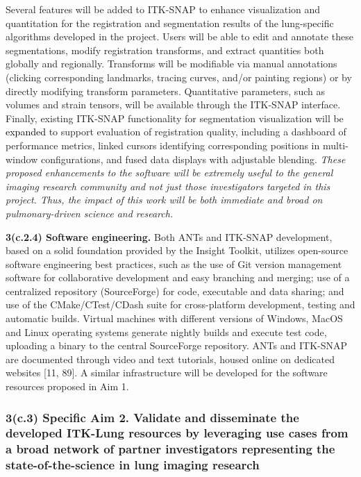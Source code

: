 \documentclass[11pt,]{article}
\begin{document}
Several features will be added to ITK-SNAP to enhance visualization and
quantitation for the registration and segmentation results of the
lung-specific algorithms developed in the project. Users will be able to
edit and annotate these segmentations, modify registration transforms,
and extract quantities both globally and regionally. Transforms will be
modifiable via manual annotations (clicking corresponding landmarks,
tracing curves, and/or painting regions) or by directly modifying
transform parameters. Quantitative parameters, such as volumes and
strain tensors, will be available through the ITK-SNAP interface.
Finally, existing ITK-SNAP functionality for segmentation visualization
will be \textcolor{black}{expanded} to support evaluation of
registration quality, including a dashboard of performance metrics,
linked cursors identifying corresponding positions in multi-window
configurations, and fused data displays with adjustable blending.
\emph{These proposed enhancements to the software will be extremely
useful to the general imaging research community and not just those
investigators targeted in this project. Thus, the impact of this work
will be both immediate and broad on pulmonary-driven science and
research.}

\textbf{3(c.2.4) Software engineering.} Both ANTs and ITK-SNAP
development, based on a solid foundation provided by the Insight
Toolkit, utilizes open-source software engineering best practices, such
as the use of Git version management software for collaborative
development and easy branching and merging; use of a centralized
repository (SourceForge) for code, executable and data sharing; and use
of the CMake/CTest/CDash suite for cross-platform development, testing
and automatic builds. Virtual machines with different versions of
Windows, MacOS and Linux operating systems generate nightly builds and
execute test code, uploading a binary to the central SourceForge
repository. ANTs and ITK-SNAP are documented through video and text
tutorials, housed online on dedicated websites {[}11, 89{]}. A similar
infrastructure will be developed for the software resources proposed in
Aim 1.

\subsubsection{\texorpdfstring{3(c.3) \textbf{Specific Aim 2.} Validate
and disseminate the developed ITK-Lung resources by leveraging use cases
from a broad network of partner investigators representing the
state-of-the-science in lung imaging
research}{3(c.3) Specific Aim 2. Validate and disseminate the developed ITK-Lung resources by leveraging use cases from a broad network of partner investigators representing the state-of-the-science in lung imaging research}}\label{c.3-specific-aim-2.-validate-and-disseminate-the-developed-itk-lung-resources-by-leveraging-use-cases-from-a-broad-network-of-partner-investigators-representing-the-state-of-the-science-in-lung-imaging-research}
\end{document}
